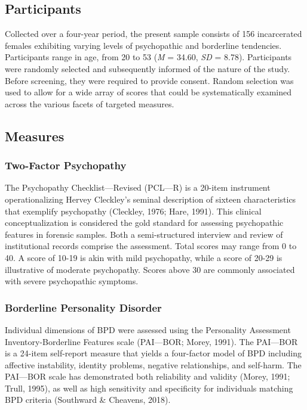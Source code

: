 \documentclass[
  man,floatsintext]{apa7}
\begin{document}
\hypertarget{participants}{%
\subsection{Participants}\label{participants}}

Collected over a four-year period, the present sample consists of 156 incarcerated females exhibiting varying levels of psychopathic and borderline tendencies. Participants range in age, from 20 to 53 (\emph{M} = 34.60, \emph{SD} = 8.78). Participants were randomly selected and subsequently informed of the nature of the study. Before screening, they were required to provide consent. Random selection was used to allow for a wide array of scores that could be systematically examined across the various facets of targeted measures.

\hypertarget{measures}{%
\subsection{Measures}\label{measures}}

\hypertarget{two-factor-psychopathy}{%
\subsubsection{Two-Factor Psychopathy}\label{two-factor-psychopathy}}

The Psychopathy Checklist---Revised (PCL---R) is a 20-item instrument operationalizing Hervey Cleckley's seminal description of sixteen characteristics that exemplify psychopathy (Cleckley, 1976; Hare, 1991). This clinical conceptualization is considered the gold standard for assessing psychopathic features in forensic samples. Both a semi-structured interview and review of institutional records comprise the assessment. Total scores may range from 0 to 40. A score of 10-19 is akin with mild psychopathy, while a score of 20-29 is illustrative of moderate psychopathy. Scores above 30 are commonly associated with severe psychopathic symptoms.

\hypertarget{borderline-personality-disorder}{%
\subsubsection{Borderline Personality Disorder}\label{borderline-personality-disorder}}

Individual dimensions of BPD were assessed using the Personality Assessment Inventory-Borderline Features scale (PAI---BOR; Morey, 1991). The PAI---BOR is a 24-item self-report measure that yields a four-factor model of BPD including affective instability, identity problems, negative relationships, and self-harm. The PAI---BOR scale has demonstrated both reliability and validity (Morey, 1991; Trull, 1995), as well as high sensitivity and specificity for individuals matching BPD criteria (Southward \& Cheavens, 2018).
\end{document}
